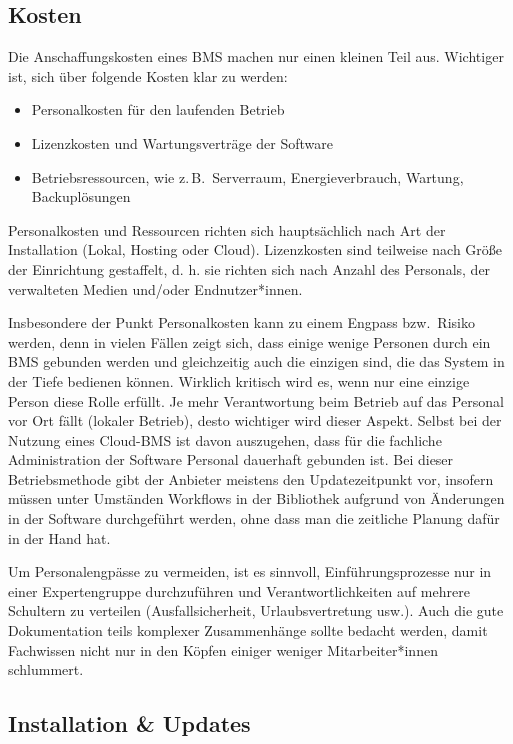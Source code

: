 \documentclass[
  11pt,
  letterpaper,
  DIV=11,
  twoside]{scrreprt}
\begin{document}
\subsection{Kosten}\label{kosten}

Die Anschaffungskosten eines BMS machen nur einen kleinen Teil aus.
Wichtiger ist, sich über folgende Kosten klar zu werden:

\begin{itemize}
\item
  Personalkosten für den laufenden Betrieb
\item
  Lizenzkosten und Wartungsverträge der Software
\item
  Betriebsressourcen, wie z.\,B.~Serverraum, Energieverbrauch, Wartung,
  Backuplösungen
\end{itemize}

Personalkosten und Ressourcen richten sich hauptsächlich nach Art der
Installation (Lokal, Hosting oder Cloud). Lizenzkosten sind teilweise
nach Größe der Einrichtung gestaffelt, d. h. sie richten sich nach
Anzahl des Personals, der verwalteten Medien und/oder Endnutzer*innen.

Insbesondere der Punkt Personalkosten kann zu einem Engpass bzw.~Risiko
werden, denn in vielen Fällen zeigt sich, dass einige wenige Personen
durch ein BMS gebunden werden und gleichzeitig auch die einzigen sind,
die das System in der Tiefe bedienen können. Wirklich kritisch wird es,
wenn nur eine einzige Person diese Rolle erfüllt. Je mehr Verantwortung
beim Betrieb auf das Personal vor Ort fällt (lokaler Betrieb), desto
wichtiger wird dieser Aspekt. Selbst bei der Nutzung eines Cloud-BMS ist
davon auszugehen, dass für die fachliche Administration der Software
Personal dauerhaft gebunden ist. Bei dieser Betriebsmethode gibt der
Anbieter meistens den Updatezeitpunkt vor, insofern müssen unter
Umständen Workflows in der Bibliothek aufgrund von Änderungen in der
Software durchgeführt werden, ohne dass man die zeitliche Planung dafür
in der Hand hat.

Um Personalengpässe zu vermeiden, ist es sinnvoll, Einführungsprozesse
nur in einer Expertengruppe durchzuführen und Verantwortlichkeiten auf
mehrere Schultern zu verteilen (Ausfallsicherheit, Urlaubsvertretung
usw.). Auch die gute Dokumentation teils komplexer Zusammenhänge sollte
bedacht werden, damit Fachwissen nicht nur in den Köpfen einiger weniger
Mitarbeiter*innen schlummert.

\subsection{Installation \& Updates}\label{installation-updates}
\end{document}
